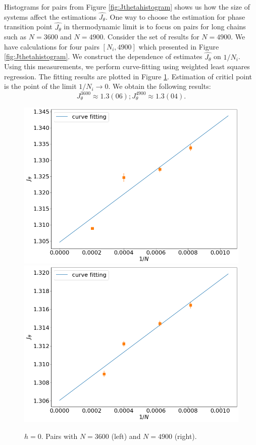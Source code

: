Histograms for pairs from Figure \ref{fig:Jthetahistogram} shows us how the size of systems affect the estimations $\hat{J_{\theta}}$. One way to choose the estimation for phase transition point $\hat{J_{\theta}}$ in thermodynamic limit is to focus on pairs for long chains such as $N=3600$ and $N=4900$. Consider the set of results for $N=4900$. We have calculations for four pairs $[N_i, 4900]$ which presented in Figure \ref{fig:Jthetahistogram}. We construct the dependence of estimates $\hat{J_{\theta}}$ on $1/N_i$. Using this measurements, we perform curve-fitting using weighted least squares regression. The fitting results are plotted in Figure \ref{fig:JthetaLinear}. Estimation of criticl point is the point of the limit $1/N_i \rightarrow 0$. We obtain the following results: 
\begin{equation}
\label{eq:critical_J_theta_2D}
J_{\theta}^{3600} \approx 1.3(06); J_{\theta}^{4900} \approx 1.3(04).
\end{equation}

 \begin{figure}[H]
	\centering
	\includegraphics[scale=0.2]{Images/criticalr2_3600.png}
	\includegraphics[scale=0.2]{Images/criticalr2.png}
	\caption{$h=0$. Pairs with $N=3600$ (left) and $N=4900$ (right).  }
	\label{fig:JthetaLinear}
\end{figure}
 



